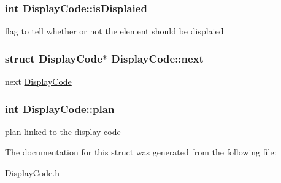\subsubsection[{\texorpdfstring{is\+Displaied}{isDisplaied}}]{\setlength{\rightskip}{0pt plus 5cm}int Display\+Code\+::is\+Displaied}\hypertarget{structDisplayCode_a11f90a324991b3b5e13721e7c7be59df}{}\label{structDisplayCode_a11f90a324991b3b5e13721e7c7be59df}
flag to tell whether or not the element should be displaied 
\subsubsection[{\texorpdfstring{next}{next}}]{\setlength{\rightskip}{0pt plus 5cm}struct {\bf Display\+Code}$\ast$ Display\+Code\+::next}\hypertarget{structDisplayCode_aad039ce333a70fec29d3a2532b68dbf6}{}\label{structDisplayCode_aad039ce333a70fec29d3a2532b68dbf6}
next \hyperlink{structDisplayCode}{Display\+Code} 
\subsubsection[{\texorpdfstring{plan}{plan}}]{\setlength{\rightskip}{0pt plus 5cm}int Display\+Code\+::plan}\hypertarget{structDisplayCode_aa6eee6772ad5cb410437a3923c9f3cd6}{}\label{structDisplayCode_aa6eee6772ad5cb410437a3923c9f3cd6}
plan linked to the display code 

The documentation for this struct was generated from the following file\+:\begin{DoxyCompactItemize}
\item 
\hyperlink{DisplayCode_8h}{Display\+Code.\+h}\end{DoxyCompactItemize}
